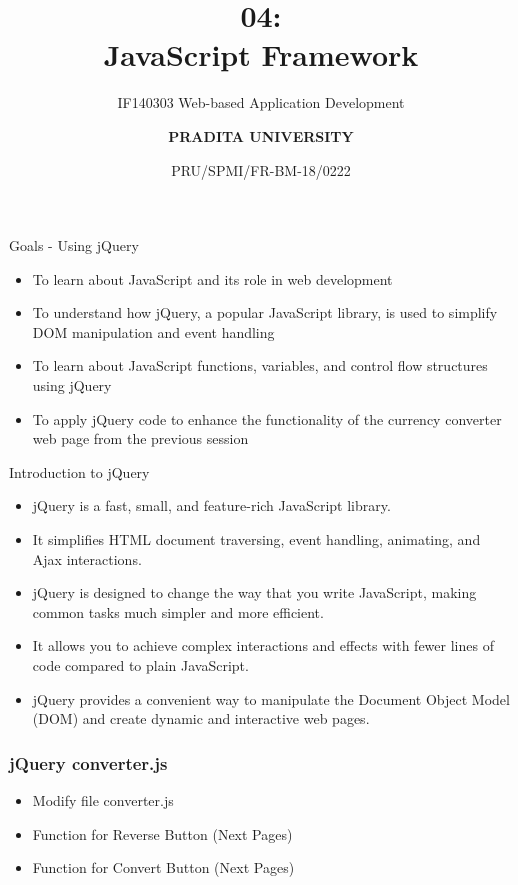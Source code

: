 \documentclass[aspectratio=169, table]{beamer}
\subtitle{IF140303 Web-based Application Development}
\title{\Huge {\textbf{04: \\JavaScript Framework}}}
\date[Serial]{\scriptsize {PRU/SPMI/FR-BM-18/0222}}
\author[Pradita]{\small {\textbf{PRADITA UNIVERSITY}}}
\begin{document}
\begin{frame}
    \titlepage
\end{frame}

\begin{frame}{Goals - Using jQuery}
    \vskip-1cm
    \begin{itemize}
        \item To learn about JavaScript and its role in web development
        \item To understand how jQuery, a popular JavaScript library, is used to simplify DOM manipulation and event handling
        \item To learn about JavaScript functions, variables, and control flow structures using jQuery
        \item To apply jQuery code to enhance the functionality of the currency converter web page from the previous session
    \end{itemize}
\end{frame}

\begin{frame}{Introduction to jQuery}
    \vskip-0cm
    \begin{itemize}
        \item jQuery is a fast, small, and feature-rich JavaScript library.
        \item It simplifies HTML document traversing, event handling, animating, and Ajax interactions.
        \item jQuery is designed to change the way that you write JavaScript, making common tasks much simpler and more efficient.
        \item It allows you to achieve complex interactions and effects with fewer lines of code compared to plain JavaScript.
        \item jQuery provides a convenient way to manipulate the Document Object Model (DOM) and create dynamic and interactive web pages.
    \end{itemize}
\end{frame}



\begin{frame}[fragile]
    \frametitle{jQuery converter.js}
    \begin{itemize}
        \item Modify file converter.js
        \item Function for Reverse Button (Next Pages)
        \item Function for Convert Button (Next Pages)
    \end{itemize}
\end{frame}
\end{document}

